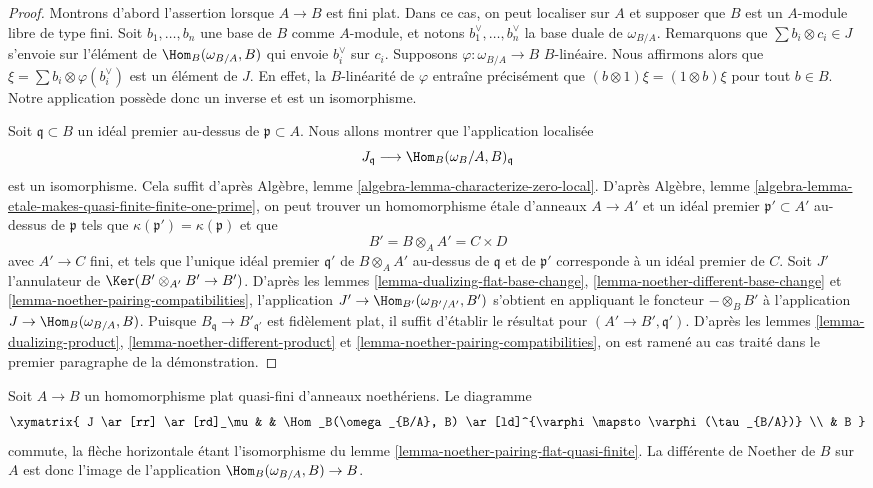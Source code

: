 \begin{proof}
Montrons d'abord l'assertion lorsque $A \to B$ est fini plat. Dans ce cas, on peut
localiser sur $A$ et supposer que $B$ est un $A$-module libre de type fini. Soit
$b_1, \ldots, b_n$ une base de $B$ comme $A$-module, et notons
$b_1^\vee, \ldots, b_n^\vee$ la base duale de $\omega_{B/A}$. Remarquons que
$\sum b_i \otimes c_i \in J$ s'envoie sur l'élément de $\Hom_B(\omega_{B/A}, B)$
qui envoie $b_i^\vee$ sur $c_i$. Supposons $\varphi : \omega_{B/A} \to B$
$B$-linéaire. Nous affirmons alors que $\xi = \sum b_i \otimes \varphi(b_i^\vee)$
est un élément de $J$. En effet, la $B$-linéarité de $\varphi$
entraîne précisément que $(b \otimes 1)\xi = (1 \otimes b)\xi$ pour tout $b \in B$.
Notre application possède donc un inverse et est un isomorphisme.

\medskip\noindent
Soit $\mathfrak q \subset B$ un idéal premier au-dessus de $\mathfrak p \subset A$.
Nous allons montrer que l'application localisée
$$
J_\mathfrak q
\longrightarrow
\Hom_B(\omega_B/A, B)_\mathfrak q
$$
est un isomorphisme.
Cela suffit d'après Algèbre, lemme \ref{algebra-lemma-characterize-zero-local}.
D'après
Algèbre, lemme \ref{algebra-lemma-etale-makes-quasi-finite-finite-one-prime},
on peut trouver un homomorphisme étale d'anneaux $A \to A'$ et un idéal
premier $\mathfrak p' \subset A'$ au-dessus de $\mathfrak p$
tels que $\kappa(\mathfrak p') = \kappa(\mathfrak p)$ et
que
$$
B' = B \otimes_A A' = C \times D
$$
avec $A' \to C$ fini, et tels que l'unique idéal premier $\mathfrak q'$
de $B \otimes_A A'$ au-dessus de $\mathfrak q$ et de $\mathfrak p'$
corresponde à un idéal premier de $C$. Soit $J'$ l'annulateur de
$\Ker(B' \otimes_{A'} B' \to B')$. D'après les
lemmes \ref{lemma-dualizing-flat-base-change},
\ref{lemma-noether-different-base-change} et
\ref{lemma-noether-pairing-compatibilities},
l'application $J' \to \Hom_{B'}(\omega_{B'/A'}, B')$
s'obtient en appliquant le foncteur $- \otimes_B B'$
à l'application $J \to \Hom_B(\omega_{B/A}, B)$.
Puisque $B_\mathfrak q \to B'_{\mathfrak q'}$ est fidèlement plat,
il suffit d'établir le résultat pour $(A' \to B', \mathfrak q')$.
D'après les lemmes \ref{lemma-dualizing-product},
\ref{lemma-noether-different-product} et
\ref{lemma-noether-pairing-compatibilities},
on est ramené au cas traité dans le premier
paragraphe de la démonstration.
\end{proof}

\begin{lemma}
\label{lemma-noether-different-flat-quasi-finite}
Soit $A \to B$ un homomorphisme plat quasi-fini d'anneaux noethériens.
Le diagramme
$$
\xymatrix{
J \ar[rr] \ar[rd]_\mu & &
\Hom_B(\omega_{B/A}, B) \ar[ld]^{\varphi \mapsto \varphi(\tau_{B/A})} \\
& B
}
$$
commute, la flèche horizontale étant l'isomorphisme du
lemme \ref{lemma-noether-pairing-flat-quasi-finite}.
La différente de Noether de $B$ sur $A$
est donc l'image de l'application $\Hom_B(\omega_{B/A}, B) \to B$.
\end{lemma}

